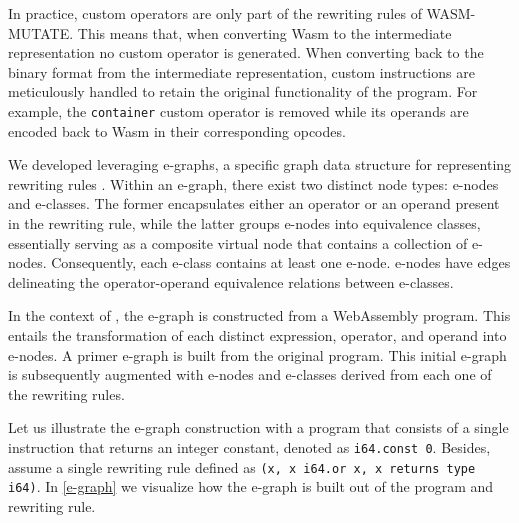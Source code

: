 In practice, custom operators are only part of the rewriting rules of WASM-MUTATE.
This means that, when converting Wasm to the intermediate representation no custom operator is generated.
When converting back to the \Wasm binary format from the intermediate representation, custom instructions are meticulously handled to retain the original functionality of the \Wasm program. 
For example, the \texttt{container} custom operator is removed while its operands are encoded back to Wasm in their corresponding opcodes.

\label{alg}

We developed \tool leveraging e-graphs, a specific graph data structure for representing rewriting rules \cite{10.1145/3571207}. 
Within an e-graph, there exist two distinct node types: e-nodes and e-classes. 
The former encapsulates either an operator or an operand present in the rewriting rule, while the latter groups e-nodes into equivalence classes, essentially serving as a composite virtual node that contains a collection of e-nodes. 
Consequently, each e-class contains at least one e-node.
e-nodes have edges delineating the operator-operand equivalence relations between e-classes.

In the context of \tool, the e-graph is constructed from a WebAssembly program.
This entails the transformation of each distinct expression, operator, and operand into e-nodes. 
A primer e-graph is built from the original program.
This initial e-graph is subsequently augmented with e-nodes and e-classes derived from each one of the rewriting rules.

Let us illustrate the e-graph construction with a program that consists of a single instruction that returns an integer constant, denoted as \texttt{i64.const 0}. 
Besides, assume a single rewriting rule defined as \texttt{(x, x i64.or x, x returns type i64)}.
In \autoref{e-graph} we visualize how the e-graph is built out of the program and rewriting rule.

